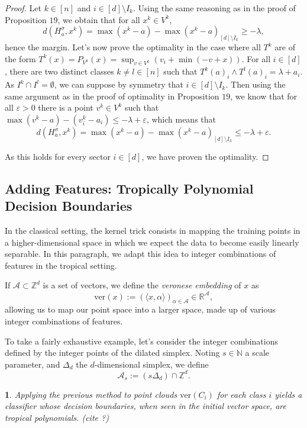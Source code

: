 \documentclass[oneside,english]{amsart}
\numberwithin{equation}{section}
\numberwithin{figure}{section}
\theoremstyle{plain}
\theoremstyle{definition}
\theoremstyle{plain}
\newtheorem{prop}[thm]{\protect\propositionname}
\theoremstyle{remark}
\theoremstyle{plain}
\theoremstyle{definition}
\theoremstyle{definition}
\providecommand{\propositionname}{Proposition}
\begin{document}
\begin{proof}
Let $k\in[n]$ and $i\in[d]\setminus I_{k}$. Using the same reasoning
as in the proof of Proposition $19$, we obtain that for all $x^{k}\in V^{k}$,
\[
d(H_{a}^{\sigma},x^{k})=\max(x^{k}-a)-\max(x^{k}-a)_{[d]\setminus I_{k}}\ge-\lambda,
\]
hence the margin. Let's now prove the optimality in the case where
all $T^{k}$ are of the form $T^{k}(x)=P_{V^{k}}(x)=\sup_{v\in V^{k}}\left(v_{i}+\min(-v+x)\right).$
For all $i\in[d]$, there are two distinct classes $k\ne l\in[n]$
such that $T^{k}(a)_{i}\wedge T^{l}(a)_{i}=\lambda+a_{i}$. As $I^{k}\cap I^{l}=\emptyset$,
we can suppose by symmetry that $i\in[d]\setminus I_{k}.$ Then using
the same argument as in the proof of optimality in Proposition $19$,
we know that for all $\varepsilon>0$ there is a point $v^{k}\in V^{k}$
such that $\max(v^{k}-a)-(v_{i}^{k}-a_{i})\le-\lambda+\varepsilon$,
which means that 
\[
d(H_{a}^{\sigma},x^{k})=\max(x^{k}-a)-\max(x^{k}-a)_{[d]\setminus I_{k}}\le-\lambda+\varepsilon.
\]

As this holds for every sector $i\in[d]$, we have proven the optimality. 
\end{proof}

\subsection{Adding Features: Tropically Polynomial Decision Boundaries}

In the classical setting, the kernel trick consists in mapping the
training points in a higher-dimensional space in which we expect the
data to become easily linearly separable. In this paragraph, we adapt
this idea to integer combinations of features in the tropical setting.

If $\mathcal{A}\subset\mathbb{Z}^{d}$ is a set of vectors, we define
the \emph{veronese embedding} of $x$ as 
\[
\text{ver}(x):=\left(\langle x,\alpha\rangle\right)_{\alpha\in\mathcal{A}}\in\mathbb{R}^{\mathcal{A}},
\]
allowing us to map our point space into a larger space, made up of
various integer combinations of features. 

To take a fairly exhaustive example, let's consider the integer combinations defined by the integer points of the dilated simplex. Noting $s\in\mathbb{N}$ a scale parameter, and $\Delta_{d}$ the $d$-dimensional simplex, we define 
\[
\mathcal{A}_{s}:=(s\Delta_{d})\cap\mathbb{Z}^{d}.
\]

\begin{prop}
Applying the previous method to point clouds $\text{ver}(C_{i})$
for each class $i$ yields a classifier whose decision boundaries,
when seen in the initial vector space, are tropical polynomials. (cite
?)
\end{prop}
\end{document}
